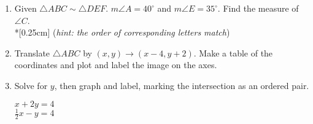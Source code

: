 \documentclass[12pt, twoside]{article}
\begin{document}
\begin{enumerate}
    \item Given $\triangle ABC \sim \triangle DEF$. $m\angle A = 40^\circ$ and $m\angle E = 35^\circ$. Find the measure of $\angle C$. \\*[0.25cm] (\emph{hint: the order of corresponding letters match}) \vspace{2.5cm}
    
    \item Translate $\triangle ABC$ by $(x,y) \rightarrow (x-4, y+2)$. Make a table of the coordinates and plot and label the image on the axes.
    \begin{flushright}
    \end{flushright}
     
\newpage
\item Solve for $y$, then graph and label, marking the intersection as an ordered pair.
        \vspace{0.25cm}
        \begin{multicols}{2}
          $x + 2y =  4$\\
          $\displaystyle \frac{1}{2} x -y = 4$
        \end{multicols}
        \vspace{4cm}

    \begin{center} %
    \end{center}

\newpage
    

\end{enumerate}
\end{document}
